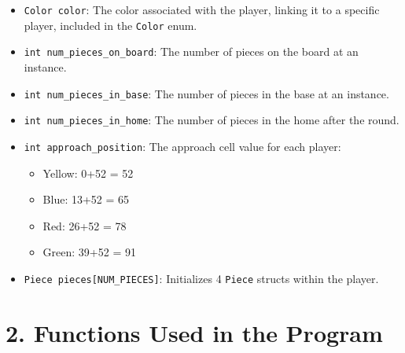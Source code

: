 \documentclass[a4paper,12pt]{article}
\begin{document}
\begin{itemize}
    \item \texttt{Color color}: The color associated with the player, linking it to a specific player, included in the \texttt{Color} enum.
    \item \texttt{int num\_pieces\_on\_board}: The number of pieces on the board at an instance.
    \item \texttt{int num\_pieces\_in\_base}: The number of pieces in the base at an instance.
    \item \texttt{int num\_pieces\_in\_home}: The number of pieces in the home after the round.
    \item \texttt{int approach\_position}: The approach cell value for each player:
    \begin{itemize}
        \item Yellow: 0+52 = 52
        \item Blue: 13+52 = 65
        \item Red: 26+52 = 78
        \item Green: 39+52 = 91
    \end{itemize}
    \item \texttt{Piece pieces[NUM\_PIECES]}: Initializes 4 \texttt{Piece} structs within the player.
\end{itemize}

\section*{2. Functions Used in the Program}
\end{document}
